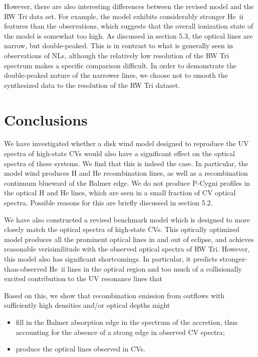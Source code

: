 \documentclass[preprint, a4paper, 11pt]{aastex}
\begin{document}
However, there are also interesting differences between the revised
model and the RW Tri data set. For example, the model exhibits
considerably stronger He~{\sc ii} features than the observations,
which suggests that the overall ionization state of the model is
somewhat too high. As discussed in section 5.3, the optical lines are
narrow, but double-peaked. This is in contrast to what is generally seen in observations
of NLs, although the relatively low resolution of the RW Tri
spectrum makes a specific comparison difficult. In order to demonstrate
the double-peaked nature of the narrower lines, we choose not to 
smooth the synthesized data to the resolution of the RW Tri dataset.


\newpage




%
%


\section{Conclusions}

We have investigated whether a disk wind model designed to reproduce
the UV spectra of high-state CVs would also have a significant effect
on the optical spectra of these systems. We find that this is indeed
the case. In particular, the model wind produces H and He
recombination lines, as well as a recombination continuum blueward of
the Balmer edge. We do not produce P-Cygni profiles
in the optical H and He lines, 
which are seen in a small fraction of CV optical spectra.
Possible reasons for this are briefly discussed in section 
5.2.

We have also constructed a revised benchmark model which is designed
to more closely match the optical spectra of high-state CVs. This
optically optimized model produces all the prominent optical lines in
and out of eclipse, and achieves reasonable verisimilitude with the
observed optical spectra of RW Tri. However, this model also has
significant shortcomings. In particular, it predicts
stronger-than-observed He~{\sc ii} lines in the optical region and too
much of a collisionally excited contribution to the UV resonance lines
that  

Based on this, we show that recombination emission 
from outflows with sufficiently high densities and/or optical depths might 

\renewcommand{\labelitemi}{$\bullet$}
\begin{itemize}
	\item fill in the Balmer absorption edge in the spectrum of
          the accretion, thus accounting for the absence of a strong edge in
          observed CV spectra;
	\item produce the optical lines observed in CVs.
\end{itemize}
\smallskip
\end{document}
